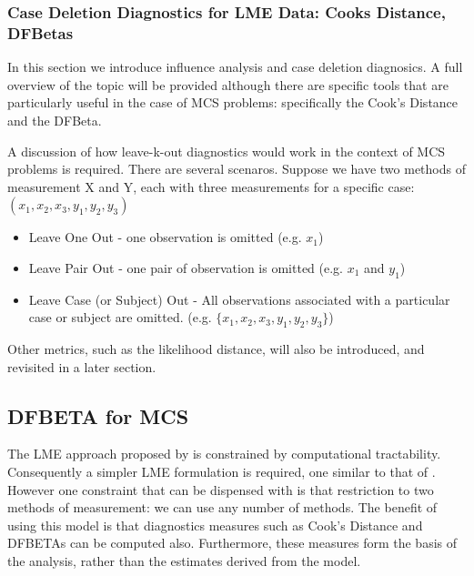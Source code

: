 \documentclass[12pt, a4paper]{report}
\theoremstyle{plain}
\theoremstyle{definition}
\theoremstyle{remark}
\begin{document}
	

	\subsubsection*{Case Deletion Diagnostics for LME Data: Cooks Distance, DFBetas}
	In this section we introduce influence analysis and case deletion diagnosics. A full overview of the topic will be provided although there are specific tools that are particularly useful in the case of MCS problems: specifically the Cook's Distance and the DFBeta.
	
	A discussion of how leave-k-out diagnostics would work in the context of MCS problems is required. There are several scenaros. Suppose we have two methods of measurement X and Y, each with three measurements for a specific case: $(x_1,x_2,x_3,y_1,y_2,y_3)$
	
	\begin{itemize}
		\item Leave One Out - one observation is omitted (e.g. $x_1$)
		\item Leave Pair Out - one pair of observation  is omitted (e.g. $x_1$ and $y_1$)
		\item Leave Case (or Subject) Out - All observations associated with a particular case or subject are omitted. (e.g. $\{x_1,x_2,x_3,y_1,y_2,y_3\}$)
	\end{itemize}
	Other metrics, such as the likelihood distance, will also be introduced, and revisited in a later section.
	

	\subsection{DFBETA for MCS}
	The LME approach proposed by \citet{ARoy2009} is constrained by computational tractability. 
	Consequently a simpler LME formulation is required, one similar to that of \citet{BXC2008}. However one constraint that can be dispensed with is that restriction to 
	two methods of measurement: we can use any number of methods.
	The benefit of using this model is that diagnostics measures such as Cook's Distance and DFBETAs can be computed also. Furthermore, these measures
	form the basis of the analysis, rather than the estimates derived from the model.
	
\end{document}
